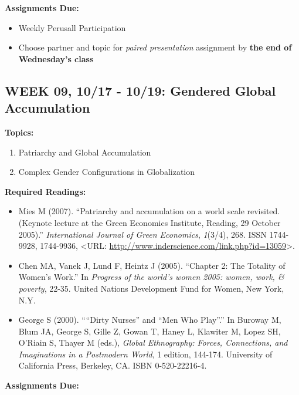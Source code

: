 \documentclass[11pt,]{article}
\providecommand{\tightlist}{%
  \setlength{\itemsep}{0pt}\setlength{\parskip}{0pt}}
\begin{document}
\textbf{Assignments Due:}

\begin{itemize}
\tightlist
\item
  Weekly Perusall Participation
\item
  Choose partner and topic for \emph{paired presentation} assignment by
  \textbf{the end of Wednesday's class}
\end{itemize}

\hypertarget{week-09-1017---1019-gendered-global-accumulation}{%
\subsection{WEEK 09, 10/17 - 10/19: Gendered Global
Accumulation}\label{week-09-1017---1019-gendered-global-accumulation}}

\textbf{Topics:}

\begin{enumerate}
\def\labelenumi{(\arabic{enumi})}
\tightlist
\item
  Patriarchy and Global Accumulation
\item
  Complex Gender Configurations in Globalization
\end{enumerate}

\textbf{Required Readings:}

\begin{itemize}
\item
  Mies M (2007). ``Patriarchy and accumulation on a world scale
  revisited. (Keynote lecture at the Green Economics Institute, Reading,
  29 October 2005).'' \emph{International Journal of Green Economics},
  \emph{1}(3/4), 268. ISSN 1744-9928, 1744-9936, \textless URL:
  \url{http://www.inderscience.com/link.php?id=13059}\textgreater.
\item
  Chen MA, Vanek J, Lund F, Heintz J (2005). ``Chapter 2: The Totality
  of Women's Work.'' In \emph{Progress of the world's women 2005: women,
  work, \& poverty}, 22-35. United Nations Development Fund for Women,
  New York, N.Y.
\item
  George S (2000). ````Dirty Nurses'' and ``Men Who Play''.'' In Buroway
  M, Blum JA, George S, Gille Z, Gowan T, Haney L, Klawiter M, Lopez SH,
  O'Riain S, Thayer M (eds.), \emph{Global Ethnography: Forces,
  Connections, and Imaginations in a Postmodern World}, 1 edition,
  144-174. University of California Press, Berkeley, CA. ISBN
  0-520-22216-4.
\end{itemize}

\textbf{Assignments Due:}
\end{document}
